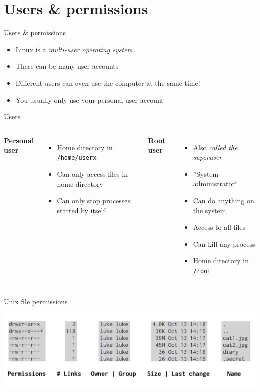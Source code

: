     \section{Users \& permissions}

    \begin{frame}[t,fragile]{Users \& permissions}
        \begin{itemize}
            \item{Linux is a \emph{multi-user operating system}}
            \item{There can be many user accounts}
            \item{Different users can even use the computer at the same time!}
            \item{You usually only use your personal user account}
        \end{itemize}
    \end{frame}

    \begin{frame}[t,fragile]{Users}
        \begin{columns}[T]
            \textbf{Personal user}
            \begin{itemize}
                \item{Home directory in \texttt{/home/userx}}
                \item{Can only access files in home directory}
                \item{Can only stop processes started by itself}
            \end{itemize}
            \textbf{Root user}
            \begin{itemize}
                \item{Also \emph{called the superuser}}
                \item{''System administrator``}
                \item{Can do anything on the system}
                \item{Access to all files}
                \item{Can kill any process}
                \item{Home directory in \texttt{/root}}
            \end{itemize}
        \end{columns}
    \end{frame}

    \begin{frame}[t,fragile]{Unix file permissions}
        \vspace{0.7cm}
        \begin{center}
            \includegraphics[width=1.0\textwidth]{img/permissions_overview.png}
        \end{center}
    \end{frame}

